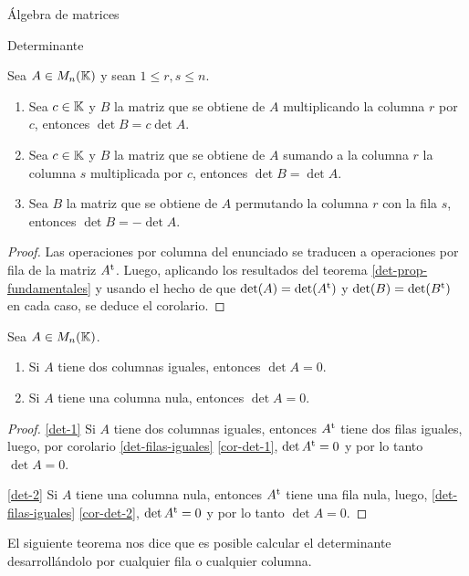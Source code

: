 \begin{chapter}{\'Algebra de matrices}
\begin{section}{Determinante}
    
    \begin{teorema}\label{det-opr-col}
        Sea $A  \in M_n(\mathbb K)$ y sean $1 \le r,s \le n$.
        \begin{enumerate}
            \item Sea $c \in \mathbb K$ y $B$ la matriz que se obtiene de $A$ multiplicando la columna $r$ por $c$, entonces $\det B = c \det A$.
            \item  Sea $c \in \mathbb K$ y $B$ la matriz que se obtiene de $A$ sumando a la columna $r$ la columna $s$ multiplicada por $c$, entonces $\det B = \det A$.
            \item Sea $B$ la matriz que se obtiene de $A$ permutando la columna $r$ con la fila $s$, entonces $\det B = -\det A$.
        \end{enumerate}
    \end{teorema}
    \begin{proof}
        Las operaciones por columna del enunciado se traducen a operaciones por fila de la matriz $A^{\operatorname{t}}$. Luego, aplicando los resultados del teorema  \ref{det-prop-fundamentales} y usando el hecho de que $\det(A) = \det(A^{\operatorname{t}})$ y $\det(B) = \det(B^{\operatorname{t}})$ en cada caso, se deduce el corolario. 
    \end{proof}
    
    \begin{corolario} Sea $A  \in M_n(\mathbb K)$.
        \begin{enumerate}
            \item\label{det-1} Si $A$ tiene dos columnas iguales,  entonces $\det A=0$.
            \item\label{det-2} Si $A$ tiene una columna nula, entonces $\det A =0$.
        \end{enumerate}
    \end{corolario}
    \begin{proof}
        \ref{det-1} Si $A$ tiene dos columnas iguales,  entonces $A^{\operatorname{t}}$ tiene dos filas iguales, luego, por corolario \ref{det-filas-iguales} \ref{cor-det-1},  $\det A^{\operatorname{t}} =0$ y por lo tanto $\det A=0$.
        
        \ref{det-2} Si $A$ tiene una columna nula,  entonces $A^{\operatorname{t}}$ tiene una fila nula, luego, \ref{det-filas-iguales} \ref{cor-det-2}, $\det A^{\operatorname{t}} =0$ y por lo tanto $\det A=0$.
    \end{proof}
    
        El siguiente teorema nos dice  que es posible calcular el determinante desarrollándolo por cualquier fila o cualquier columna. 
    

\end{section}
\end{chapter}
